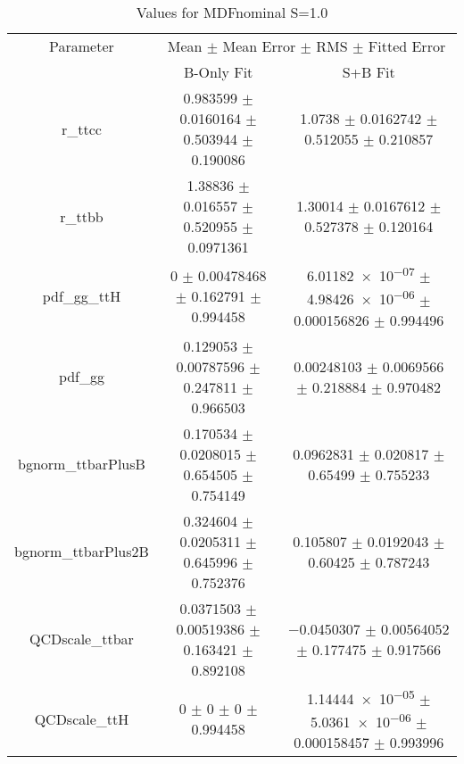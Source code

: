 \begin{table}
\centering
\caption{Values for MDFnominal S=1.0}
\begin{tabular}{ccc}
\toprule
Parameter & \multicolumn{2}{c}{Mean $\pm$ Mean Error $\pm$ RMS $\pm$ Fitted Error}\\
 & B-Only Fit & S+B Fit\\
\midrule
r\_ttcc & \num{0.983599} $\pm$ \num{0.0160164} $\pm$ \num{0.503944} $\pm$ \num{0.190086} & \num{1.0738} $\pm$ \num{0.0162742} $\pm$ \num{0.512055} $\pm$ \num{0.210857}\\
r\_ttbb & \num{1.38836} $\pm$ \num{0.016557} $\pm$ \num{0.520955} $\pm$ \num{0.0971361} & \num{1.30014} $\pm$ \num{0.0167612} $\pm$ \num{0.527378} $\pm$ \num{0.120164}\\
pdf\_gg\_ttH & \num{0} $\pm$ \num{0.00478468} $\pm$ \num{0.162791} $\pm$ \num{0.994458} & \num{6.01182e-07} $\pm$ \num{4.98426e-06} $\pm$ \num{0.000156826} $\pm$ \num{0.994496}\\
pdf\_gg & \num{0.129053} $\pm$ \num{0.00787596} $\pm$ \num{0.247811} $\pm$ \num{0.966503} & \num{0.00248103} $\pm$ \num{0.0069566} $\pm$ \num{0.218884} $\pm$ \num{0.970482}\\
bgnorm\_ttbarPlusB & \num{0.170534} $\pm$ \num{0.0208015} $\pm$ \num{0.654505} $\pm$ \num{0.754149} & \num{0.0962831} $\pm$ \num{0.020817} $\pm$ \num{0.65499} $\pm$ \num{0.755233}\\
bgnorm\_ttbarPlus2B & \num{0.324604} $\pm$ \num{0.0205311} $\pm$ \num{0.645996} $\pm$ \num{0.752376} & \num{0.105807} $\pm$ \num{0.0192043} $\pm$ \num{0.60425} $\pm$ \num{0.787243}\\
QCDscale\_ttbar & \num{0.0371503} $\pm$ \num{0.00519386} $\pm$ \num{0.163421} $\pm$ \num{0.892108} & \num{-0.0450307} $\pm$ \num{0.00564052} $\pm$ \num{0.177475} $\pm$ \num{0.917566}\\
QCDscale\_ttH & \num{0} $\pm$ \num{0} $\pm$ \num{0} $\pm$ \num{0.994458} & \num{1.14444e-05} $\pm$ \num{5.0361e-06} $\pm$ \num{0.000158457} $\pm$ \num{0.993996}\\
\bottomrule
\end{tabular}
\end{table}